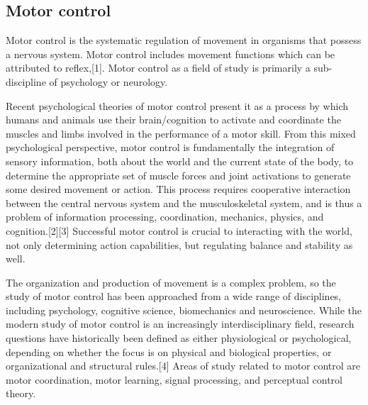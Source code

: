\subsection{Motor control}
Motor control is the systematic regulation of movement in organisms that possess 
a nervous system. Motor control includes movement functions which can be attributed 
to reflex,[1]. Motor control as a field of study is primarily a sub-discipline of 
psychology or neurology.

Recent psychological theories of motor control present it as a process by which 
humans and animals use their brain/cognition to activate and coordinate the muscles 
and limbs involved in the performance of a motor skill. From this mixed psychological 
perspective, motor control is fundamentally the integration of sensory information, 
both about the world and the current state of the body, to determine the appropriate 
set of muscle forces and joint activations to generate some desired movement or action. 
This process requires cooperative interaction between the central nervous system and 
the musculoskeletal system, and is thus a problem of information processing, 
coordination, mechanics, physics, and cognition.[2][3] Successful motor control 
is crucial to interacting with the world, not only determining action capabilities, 
but regulating balance and stability as well.

The organization and production of movement is a complex problem, so the study of 
motor control has been approached from a wide range of disciplines, including 
psychology, cognitive science, biomechanics and neuroscience. While the modern 
study of motor control is an increasingly interdisciplinary field, research 
questions have historically been defined as either physiological or psychological, 
depending on whether the focus is on physical and biological properties, or 
organizational and structural rules.[4] Areas of study related to motor control 
are motor coordination, motor learning, signal processing, and perceptual control 
theory.


